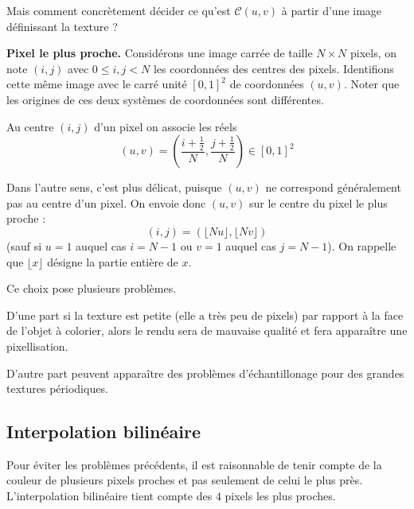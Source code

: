 \documentclass[11pt,class=report,crop=false]{standalone}
\begin{document}


Mais comment concrètement décider ce qu'est $\mathcal{C}(u,v)$ à partir d'une image définissant la texture ?

\textbf{Pixel le plus proche.}
Considérons une image carrée de taille $N\times N$ pixels, on note $(i,j)$ avec $0 \le i,j < N$ les coordonnées des centres des pixels. Identifions cette même image avec le carré unité $[0,1]^2$ de coordonnées $(u,v)$. Noter que les origines de ces deux systèmes de coordonnées sont différentes.


Au centre $(i,j)$ d'un pixel on associe les réels 
$$(u,v) = \left(\frac{i+\frac12}{N}, \frac{j+\frac12}{N} \right)\in [0,1]^2$$



Dans l'autre sens, c'est plus délicat, puisque $(u,v)$ ne correspond généralement pas au centre d'un pixel.
On envoie donc $(u,v)$ sur le centre du pixel le plus proche :
$$(i,j) = \left( \lfloor Nu \rfloor, \lfloor Nv \rfloor \right)$$
(sauf si $u=1$ auquel cas $i=N-1$ ou $v=1$ auquel cas $j=N-1$).
On rappelle que $\lfloor x \rfloor$ désigne la partie entière de $x$.

Ce choix pose plusieurs problèmes.

D'une part si la texture est petite (elle a très peu de pixels) par rapport à la face de l'objet à colorier, alors le rendu sera de mauvaise qualité et fera apparaître une pixellisation.



D'autre part peuvent apparaître des problèmes d'échantillonage pour des grandes textures périodiques.



\subsection{Interpolation bilinéaire}


Pour éviter les problèmes précédents, il est raisonnable de tenir compte de la couleur de plusieurs pixels proches et pas seulement de celui le plus près. L'interpolation bilinéaire tient compte des $4$ pixels les plus proches.
\end{document}
